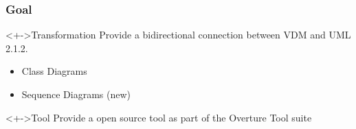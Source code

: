 %
%
\frame
{
  \frametitle{Goal}

\begin{center}

	\begin{block}<+->{Transformation}
	Provide a bidirectional connection between VDM and UML 2.1.2. 
	\begin{itemize}
		\item Class Diagrams
		\item Sequence Diagrams (new)
	\end{itemize}
	\end{block}
\vspace{1cm}
	\begin{block}<+->{Tool}
	Provide a open source tool as part of the Overture Tool suite
	\end{block}
%	  	
\end{center}
}


